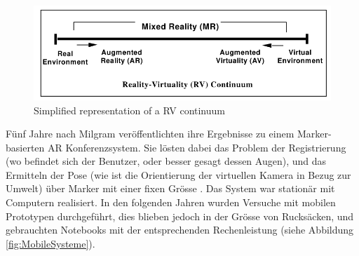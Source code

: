 \documentclass[a4paper]{scrreprt}
\begin{document}
\begin{figure}[htb]
	\includegraphics[keepaspectratio, width=\textwidth]{MR_milgram.png}
	\caption{Simplified representation of a RV continuum \parencite{Milgram1994}}
	\label{fig:RVContiinum}
\end{figure}

Fünf Jahre nach Milgram veröffentlichten \citeauthor{Kato1999} ihre Ergebnisse zu einem Marker-basierten AR Konferenzsystem. Sie lösten dabei das Problem der Registrierung (wo befindet sich der Benutzer, oder besser gesagt dessen Augen), und das Ermitteln der Pose (wie ist die Orientierung der virtuellen Kamera in Bezug zur Umwelt) über Marker mit einer fixen Grösse \parencite{Kato1999}. Das System war stationär mit Computern realisiert. In den folgenden Jahren wurden Versuche mit  mobilen Prototypen durchgeführt, dies blieben jedoch in der Grösse von Rucksäcken, und gebrauchten Notebooks mit der entsprechenden Rechenleistung (siehe Abbildung \ref{fig:MobileSysteme}).
\end{document}
